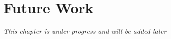
\chapter{Future Work}

\textit{This chapter is under progress and will be added later}

\begin{comment}

\section{Visualization Tool}

- Performance and efficiency
- Prediction
- Generalize even more
- More metrics
- Show architecture

\section{Case Study in Face Recognition}

- Test with a larger dataset
- Train a full model, instead of only the top layers
- 

\end{comment}


\cleardoublepage